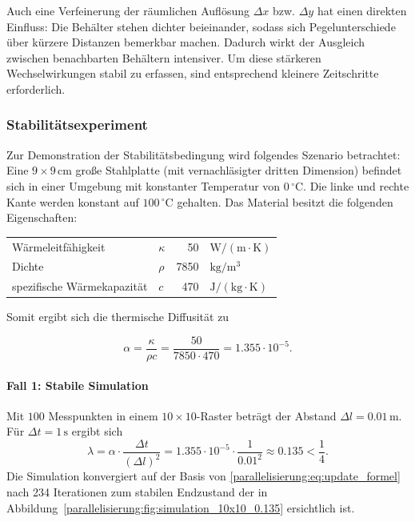 Auch eine Verfeinerung der räumlichen Auflösung \(\Delta x \) bzw. \(\Delta y\) hat einen direkten Einfluss: Die Behälter stehen dichter beieinander, sodass sich Pegelunterschiede über kürzere Distanzen bemerkbar machen. Dadurch wirkt der Ausgleich zwischen benachbarten Behältern intensiver. Um diese stärkeren Wechselwirkungen stabil zu erfassen, sind entsprechend kleinere Zeitschritte erforderlich.

\subsubsection{Stabilitätsexperiment}

Zur Demonstration der Stabilitätsbedingung wird folgendes Szenario betrachtet:
Eine \(9 \times 9 \, \mathrm{cm}\) große Stahlplatte (mit vernachläsigter dritten Dimension) befindet sich in einer Umgebung mit konstanter Temperatur von \(0\,^{\circ}\mathrm{C}\).  
Die linke und rechte Kante werden konstant auf \(100\,^{\circ}\mathrm{C}\) gehalten.  
Das Material besitzt die folgenden Eigenschaften:
\begin{center}
	\begin{tabular}{llrl}
		Wärmeleitfähigkeit & \(\kappa\) & 50 &
		\(\mathrm{W/(m \cdot K)}\) \\
		Dichte & \(\rho\)   &  7850 & \(\mathrm{kg/m^3}\) \\
		spezifische Wärmekapazität & \(c\) &  470 & \(\mathrm{J/(kg \cdot K)}\)
	\end{tabular}
\end{center}
Somit ergibt sich die thermische Diffusität zu


\[
\alpha =
\frac{\kappa}{\rho c}
=
\frac{50}{7850 \cdot 470}
= 1.355 \cdot 10^{-5}.
\]

\paragraph{Fall 1: Stabile Simulation}  
Mit \(100\) Messpunkten in einem \(10\times 10\)-Raster beträgt der Abstand \(\Delta l = 0.01\,\mathrm{m}\).  
Für \(\Delta t = 1\,\mathrm{s}\) ergibt sich
\[
\lambda =
\alpha \cdot \frac{\Delta t}{(\Delta l)^2}
=
1.355\cdot 10^{-5} \cdot \frac{1}{0.01^2}
\approx 0.135 < \frac14.
\]
Die Simulation konvergiert auf der Basis von \eqref{parallelisierung:eq:update_formel} nach 234 Iterationen zum stabilen Endzustand der in  Abbildung~\ref{parallelisierung:fig:simulation_10x10_0.135} ersichtlich ist.

